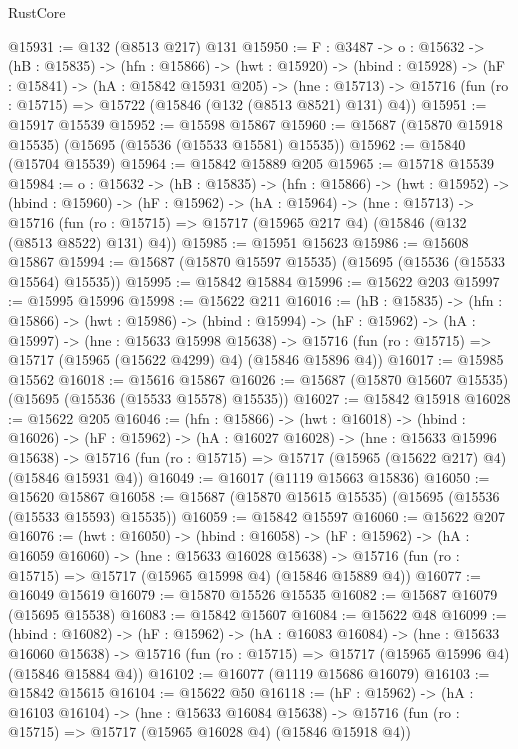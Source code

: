 \begin{lexlean}{RustCore}
\begin{coremodule}
@15931 := @132 (@8513 @217) @131
@15950 := {F : @3487} ->
  {o : @15632} ->
  (hB : @15835) ->
  (hfn : @15866) ->
  (hwt : @15920) ->
  (hbind : @15928) ->
  (hF : @15841) ->
  (hA : @15842 @15931 @205) ->
  (hne : @15713) -> @15716 (fun (ro : @15715) => @15722 (@15846 (@132 (@8513 @8521) @131) @4))
@15951 := @15917 @15539
@15952 := @15598 @15867
@15960 := @15687 (@15870 @15918 @15535) (@15695 (@15536 (@15533 @15581) @15535))
@15962 := @15840 (@15704 @15539)
@15964 := @15842 @15889 @205
@15965 := @15718 @15539
@15984 := {o : @15632} ->
  (hB : @15835) ->
  (hfn : @15866) ->
  (hwt : @15952) ->
  (hbind : @15960) ->
  (hF : @15962) ->
  (hA : @15964) ->
  (hne : @15713) ->
  @15716 (fun (ro : @15715) => @15717 (@15965 @217 @4) (@15846 (@132 (@8513 @8522) @131) @4))
@15985 := @15951 @15623
@15986 := @15608 @15867
@15994 := @15687 (@15870 @15597 @15535) (@15695 (@15536 (@15533 @15564) @15535))
@15995 := @15842 @15884
@15996 := @15622 @203
@15997 := @15995 @15996
@15998 := @15622 @211
@16016 := (hB : @15835) ->
  (hfn : @15866) ->
  (hwt : @15986) ->
  (hbind : @15994) ->
  (hF : @15962) ->
  (hA : @15997) ->
  (hne : @15633 @15998 @15638) ->
  @15716 (fun (ro : @15715) => @15717 (@15965 (@15622 @4299) @4) (@15846 @15896 @4))
@16017 := @15985 @15562
@16018 := @15616 @15867
@16026 := @15687 (@15870 @15607 @15535) (@15695 (@15536 (@15533 @15578) @15535))
@16027 := @15842 @15918
@16028 := @15622 @205
@16046 := (hfn : @15866) ->
  (hwt : @16018) ->
  (hbind : @16026) ->
  (hF : @15962) ->
  (hA : @16027 @16028) ->
  (hne : @15633 @15996 @15638) ->
  @15716 (fun (ro : @15715) => @15717 (@15965 (@15622 @217) @4) (@15846 @15931 @4))
@16049 := @16017 (@1119 @15663 @15836)
@16050 := @15620 @15867
@16058 := @15687 (@15870 @15615 @15535) (@15695 (@15536 (@15533 @15593) @15535))
@16059 := @15842 @15597
@16060 := @15622 @207
@16076 := (hwt : @16050) ->
  (hbind : @16058) ->
  (hF : @15962) ->
  (hA : @16059 @16060) ->
  (hne : @15633 @16028 @15638) ->
  @15716 (fun (ro : @15715) => @15717 (@15965 @15998 @4) (@15846 @15889 @4))
@16077 := @16049 @15619
@16079 := @15870 @15526 @15535
@16082 := @15687 @16079 (@15695 @15538)
@16083 := @15842 @15607
@16084 := @15622 @48
@16099 := (hbind : @16082) ->
  (hF : @15962) ->
  (hA : @16083 @16084) ->
  (hne : @15633 @16060 @15638) ->
  @15716 (fun (ro : @15715) => @15717 (@15965 @15996 @4) (@15846 @15884 @4))
@16102 := @16077 (@1119 @15686 @16079)
@16103 := @15842 @15615
@16104 := @15622 @50
@16118 := (hF : @15962) ->
  (hA : @16103 @16104) ->
  (hne : @15633 @16084 @15638) ->
  @15716 (fun (ro : @15715) => @15717 (@15965 @16028 @4) (@15846 @15918 @4))

\end{coremodule}
\end{lexlean}
